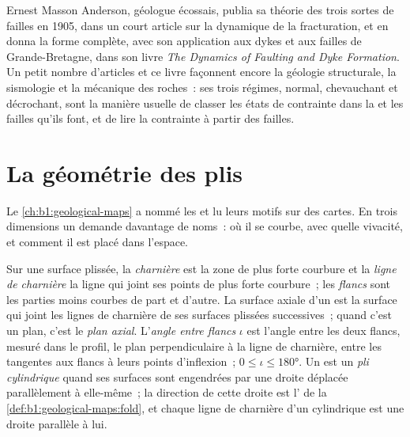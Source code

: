 \begin{history}
Ernest Masson Anderson, géologue écossais, publia sa théorie des
trois sortes de failles en 1905, dans un court article sur la dynamique de la fracturation,
et en donna la forme complète, avec son application aux dykes et aux failles de
Grande-Bretagne, dans son livre \emph{The Dynamics of Faulting and Dyke Formation}. Un
petit nombre d'articles et ce livre façonnent encore la géologie structurale, la
sismologie et la mécanique des roches~: ses trois régimes, normal, chevauchant et
décrochant, sont la manière usuelle de classer les états de contrainte dans la  et
les failles qu'ils font, et de lire la contrainte à partir des failles.
\end{history}

\section{La géométrie des plis}\label{sec:b1:faults-folds-fabrics:folds}

Le \cref{ch:b1:geological-maps} a nommé les  et lu leurs motifs sur des cartes.
En trois dimensions un  demande davantage de noms~: où il se courbe, avec quelle vivacité, et
comment il est placé dans l'espace.

\begin{definition}\label{def:b1:faults-folds-fabrics:fold-elements}
Sur une surface plissée, la \emph{charnière} est la zone
de plus forte courbure et la \emph{ligne de charnière} la ligne qui
joint ses points de plus forte courbure~; les \emph{flancs} sont les parties moins courbes
de part et d'autre. La surface axiale d'un 
est la surface qui joint les lignes de charnière de ses surfaces plissées successives~;
quand c'est un plan, c'est le \emph{plan axial}.
L'\emph{angle entre flancs} $\iota$ est l'angle entre les
deux flancs, mesuré dans le profil, le plan perpendiculaire à la ligne de charnière,
entre les tangentes aux flancs à leurs points d'inflexion~;
$0 \le \iota \le \ang{180}$. Un  est un \emph{pli
cylindrique} quand ses surfaces sont engendrées par une droite
déplacée parallèlement à elle-même~; la direction de cette droite est l' de
la \cref{def:b1:geological-maps:fold}, et chaque ligne de charnière d'un  cylindrique
est une droite parallèle à lui.
\end{definition}

